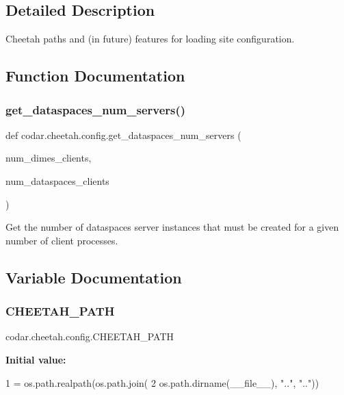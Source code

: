 \subsection{Detailed Description}
\begin{DoxyVerb}Cheetah paths and (in future) features for loading site configuration.
\end{DoxyVerb}
 

\subsection{Function Documentation}
\mbox{\label{namespacecodar_1_1cheetah_1_1config_a777b4339975017c9521b943afd76748d}} 
\subsubsection{\texorpdfstring{get\+\_\+dataspaces\+\_\+num\+\_\+servers()}{get\_dataspaces\_num\_servers()}}
{\footnotesize\ttfamily def codar.\+cheetah.\+config.\+get\+\_\+dataspaces\+\_\+num\+\_\+servers (\begin{DoxyParamCaption}\item[{}]{num\+\_\+dimes\+\_\+clients,  }\item[{}]{num\+\_\+dataspaces\+\_\+clients }\end{DoxyParamCaption})}

\begin{DoxyVerb}Get the number of dataspaces server instances that must be created for a
given number of client processes.
\end{DoxyVerb}
 

\subsection{Variable Documentation}
\mbox{\label{namespacecodar_1_1cheetah_1_1config_ab966b03187d09c54028d73f6bf908598}} 
\subsubsection{\texorpdfstring{C\+H\+E\+E\+T\+A\+H\+\_\+\+P\+A\+TH}{CHEETAH\_PATH}}
{\footnotesize\ttfamily codar.\+cheetah.\+config.\+C\+H\+E\+E\+T\+A\+H\+\_\+\+P\+A\+TH}

{\bfseries Initial value\+:}
\begin{DoxyCode}
1 =  os.path.realpath(os.path.join(
2                      os.path.dirname(\_\_file\_\_), \textcolor{stringliteral}{".."}, \textcolor{stringliteral}{".."}))
\end{DoxyCode}
